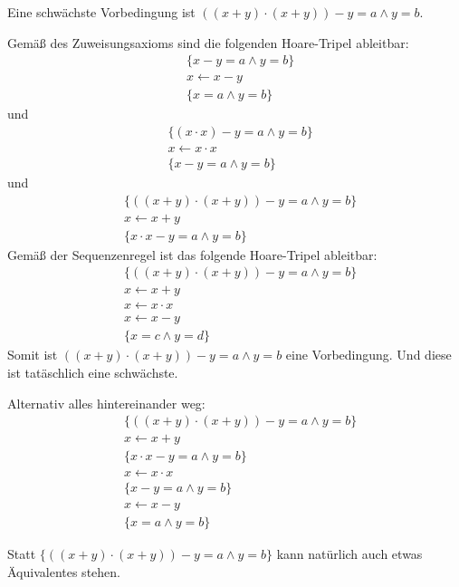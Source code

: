 \documentclass[12pt]{article}
\begin{document}
\begin{loesung}
  Eine schwächste Vorbedingung ist ${((x + y) \cdot (x + y)) - y} = a \land y = b$.

  Gemäß des Zuweisungsaxioms sind die folgenden Hoare-Tripel ableitbar:
  \begin{align*}
    & \{ x - y = a \land y = b \} \\
    & x \gets x - y \\
    & \{ x = a \land y = b \}
  \end{align*}
  und
  \begin{align*}
    & \{ (x \cdot x) - y = a \land y = b \} \\
    & x \gets x \cdot x \\
    & \{ x - y = a \land y = b \}
  \end{align*}
  und
  \begin{align*}
    & \{ ((x + y) \cdot (x + y)) - y = a \land y = b \} \\
    & x \gets x + y \\
    & \{ {x \cdot x-y} = a \land y = b \}
  \end{align*}
  Gemäß der Sequenzenregel ist das folgende Hoare-Tripel ableitbar:
  \begin{align*}
    & \{ ((x + y) \cdot (x + y)) - y = a \land y = b \} \\
    & x \gets x + y \\
    & x \gets x \cdot x \\
    & x \gets x - y \\
    & \{ x = c \land y = d \}
  \end{align*}
  Somit ist $((x + y) \cdot (x + y)) - y = a \land y = b$ eine Vorbedingung. Und diese ist tatäschlich eine schwächste.

  Alternativ alles hintereinander weg:
  \begin{align*}
    & \{ ((x + y) \cdot (x + y)) - y = a \land y = b \} \\
    & x \gets x + y \\
    & \{ x  \cdot x - y = a \land y = b \} \\
    & x \gets x \cdot x \\
    & \{ x - y = a \land y = b \} \\
    & x \gets x - y \\
    & \{ x = a \land y = b \}
  \end{align*}

  Statt $\{ ((x + y) \cdot (x + y)) - y = a \land y = b \}$ kann
  natürlich auch etwas Äquivalentes stehen.


\end{loesung}
\end{document}
